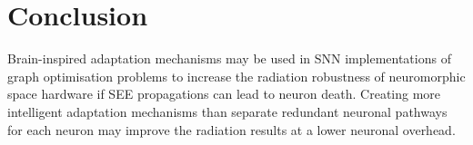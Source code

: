 \section{Conclusion}\label{sec:conclusion}
Brain-inspired adaptation mechanisms may be used in SNN implementations of graph optimisation problems to increase the radiation robustness of neuromorphic space hardware if SEE propagations can lead to neuron death. Creating more intelligent adaptation mechanisms than separate redundant neuronal pathways for each neuron may improve the radiation results at a lower neuronal overhead. 


